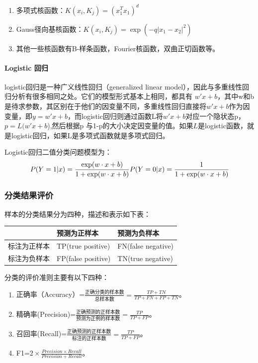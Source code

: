 \begin{enumerate}
\def\labelenumi{\arabic{enumi}.}
\tightlist
\item
  多项式核函数：\(K(x_{i},K_{j})=(x_{1}^{T}x_{1})^{d}\)
\item
  Gauss径向基核函数：\(K(x_{i},K_{j})=\exp(-q\lvert x_{1}-x_{2}\rvert^{2})\)
\item
  其他一些核函数有B-样条函数，Fourier核函数，双曲正切函数等。
\end{enumerate}

\paragraph{Logistic 回归}\label{logistic-ux56deux5f52}

logistic回归是一种广义线性回归（generalized linear
model），因此与多重线性回归分析有很多相同之处。它们的模型形式基本上相同，都具有
\(w'x+b\)，其中w和b是待求参数，其区别在于他们的因变量不同，多重线性回归直接将\(w'x+b\)作为因变量，即\(y =w'x+b\)，而logistic回归则通过函数L将\(w'x+b\)对应一个隐状态p，\(p =L(w'x+b\)),然后根据p
与1-p的大小决定因变量的值。如果\(L\)是logistic函数，就是logistic回归，如果L是多项式函数就是多项式回归。

Logistic回归二值分类问题模型为： \[
P(Y=1|x)=\frac {\exp(w \cdot x + b)} {1 + \exp(w \cdot x + b)} \\ 
P(Y=0|x)=\frac {1} {1 + \exp(w \cdot x + b)}
\]

\subsubsection{分类结果评价}\label{ux5206ux7c7bux7ed3ux679cux8bc4ux4ef7}

样本的分类结果分为四种，描述和表示如下表：

\begin{longtable}[]{@{}lll@{}}
\toprule
& 预测为正样本 & 预测为负样本\tabularnewline
\midrule
\endhead
标注为正样本 & TP(true positive) & FN(false negative)\tabularnewline
标注为负样本 & FP(false positive) & TN(true negative)\tabularnewline
\bottomrule
\end{longtable}

分类的评价准则主要有以下四种：

\begin{enumerate}
\def\labelenumi{\arabic{enumi}.}
\tightlist
\item
  正确率（Accuracy）=\(\frac{正确分类的样本数}{总样本数}=\frac{TP+TN}{TP+FN+FP+TN}\)。
\item
  精确率(Precision)=\(\frac{正确预测的正样本数}{预测为正例的样本数}=\frac{TP}{TP+FP}\)。
\item
  召回率(Recall)=\(\frac{正确预测的正样本数}{标注的正样本数}=\frac{TP}{TP+FP}\)。
\item
  F1=\(2\times \frac{Precision\times Recall}{Precision+Recall}\)。
\end{enumerate}

